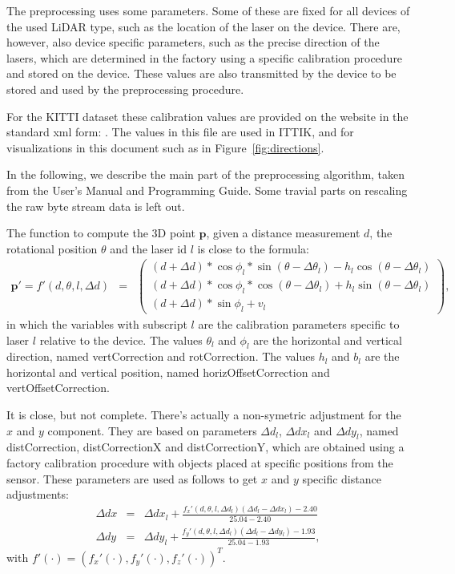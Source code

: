\documentclass[english]{article}
\begin{document}
The preprocessing uses some parameters. Some of these are fixed for all
devices of the used LiDAR type, such as the location of the laser on the
device. There are, however, also device specific parameters, such as the
precise direction of the lasers, which are determined in the factory
using a specific calibration procedure and stored on the device. These
values are also transmitted by the device to be stored and used by the
preprocessing procedure.

For the KITTI dataset these calibration values are provided on the
website in the standard xml form:
. The values in
this file are used in ITTIK, and for visualizations in this document
such as in Figure~\ref{fig:directions}.

In the following, we describe the main part of the preprocessing
algorithm, taken from the User's Manual and Programming Guide. Some
travial parts on rescaling the raw byte stream data is left out.

The function to compute the 3D point $\mathbf{p}$, given a distance measurement $d$,
the rotational position $\theta$ and the laser id $l$ is close to
the formula:
\begin{eqnarray}
  \mathbf{p'} =
  f'(d, \theta, l, \Delta d) &=& \left(
           \begin{array}{l}
             (d + \Delta d) * \cos{\phi_l} * \sin(\theta - \Delta \theta_l) - h_l \cos(\theta - \Delta \theta_l) \\
             (d + \Delta d) * \cos{\phi_l} * \cos(\theta - \Delta \theta_l) + h_l \sin(\theta - \Delta \theta_l) \\
             (d + \Delta d) * \sin{\phi_l} + v_l
           \end{array}
         \right),
  \label{eq:ptilde}
\end{eqnarray}
in which the variables with subscript $l$ are the calibration parameters
specific to laser $l$ relative to the device. The values $\theta_l$ and
$\phi_l$ are the horizontal and vertical direction, named vertCorrection
and rotCorrection. The values $h_l$ and $b_l$ are the horizontal and
vertical position, named horizOffsetCorrection and vertOffsetCorrection.

It is close, but not complete. There's actually a non-symetric adjustment
for the $x$ and $y$ component. They are based on parameters $\Delta
d_l$, $\Delta dx_l$ and $\Delta dy_l$, named distCorrection,
distCorrectionX and distCorrectionY, which are obtained using a factory
calibration procedure with objects placed at specific positions from the
sensor.  These parameters are used as follows to get $x$ and $y$
specific distance adjustments:
\begin{eqnarray}
  \Delta dx &=& \Delta dx_l + \frac{f_x'(d, \theta, l, \Delta d_l)(\Delta d_l - \Delta dx_l) - 2.40}{25.04 - 2.40}  \label{eq:ddx} \\
  \Delta dy &=& \Delta dy_l + \frac{f_y'(d, \theta, l, \Delta d_l)(\Delta d_l - \Delta dy_l) - 1.93}{25.04 - 1.93}, \label{eq:ddy}
\end{eqnarray}
with $f'(\cdot) = \left(f_x'(\cdot) , f_y'(\cdot) , f_z'(\cdot) \right)^T$.
\end{document}
